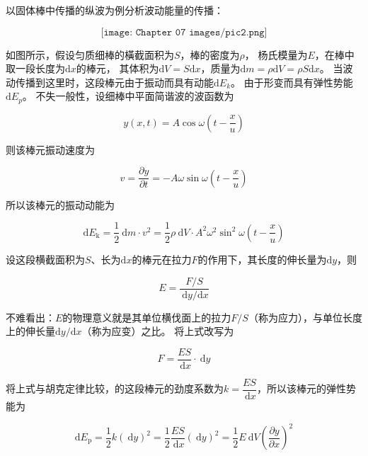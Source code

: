 \documentclass[
	12pt, %
	a4paper, %
]{myLegrandOrangeBook}
\newcommand{\rmd}{\mathrm{d}}
\begin{document}
    以固体棒中传播的纵波为例分析波动能量的传播：

    \[
        \texttt{[image: Chapter 07 images/pic2.png]}
    \]

    如图所示，假设匀质细棒的橫截面积为\(S \)，棒的密度为\(\rho\)，
    杨氏模量为\(E \)，在棒中取一段长度为\(\rmd x\)的棒元，
    其体积为\(\rmd V=S\rmd x\)，质量为\(\rmd m =\rho \rmd V=\rho S\rmd x\)。
    当波动传播到这里时，这段棒元由于振动而具有动能\(\rmd E_k\)。
    由于形变而具有弹性势能\(\rmd E_p\)。 不失一般性，设细棒中平面简谐波的波函数为

    \begin{equation}
        y(x, t)=A \cos \omega\left(t-\frac{x}{u}\right)
        \label{7-3-1}
    \end{equation}

    则该棒元振动速度为

    \begin{equation}
        v=\frac{\partial y}{\partial t}=-A \omega \sin \omega\left(t-\frac{x}{u}\right)
    \end{equation}

    所以该棒元的振动动能为

    \begin{equation}
        \mathrm{d} E_{\mathrm{k}}=\frac{1}{2} \mathrm{~d} m \cdot v^2=
        \frac{1}{2} \rho \mathrm{~d} V \cdot A^2 \omega^2 \sin ^2 \omega\left(t-\frac{x}{u}\right)
    \end{equation}

    设这段横截面积为\(S \)、长为\(\rmd x\)的棒元在拉力\(F \)的作用下，其长度的伸长量为\(\rmd y\)，则

    \begin{equation}
        E=\frac{F / S}{\mathrm{~d} y / \mathrm{d} x}
    \end{equation}

    不难看出：$E$的物理意义就是其单位横伐面上的拉力$F / S$（称为应力），与单位长度上的伸长量$\rmd y / \mathrm{d} x$（称为应变）之比。
    将上式改写为
    
    \begin{equation}
        F=\frac{E S}{\mathrm{~d} x} \cdot \mathrm{~d} y
    \end{equation}

    将上式与胡克定律比较，的这段棒元的劲度系数为$k=\dfrac{E S}{\mathrm{~d} x}$，所以该棒元的弹性势能为

    \begin{equation}
        \mathrm{d} E_{\mathrm{p}}=\frac{1}{2} k(\mathrm{~d} y)^2=\frac{1}{2} \frac{E S}{\mathrm{~d} x}(\mathrm{~d} y)^2
        =\frac{1}{2} E \mathrm{~d} V\left(\frac{\partial y}{\partial x}\right)^2
        \label{7-3-6}
    \end{equation}
\end{document}

